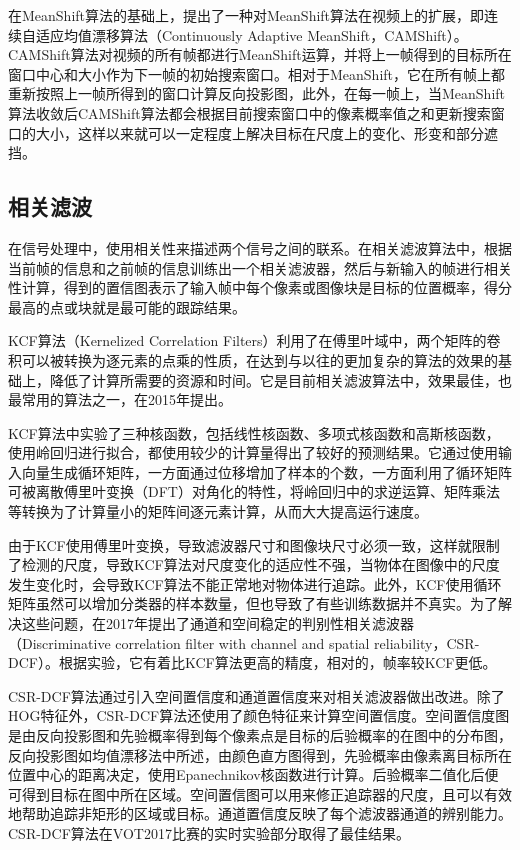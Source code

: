   在MeanShift算法的基础上，\citet{bradski1998computer}提出了一种对MeanShift算法在视频上的扩展，即连续自适应均值漂移算法（Continuously Adaptive MeanShift，CAMShift）。CAMShift算法对视频的所有帧都进行MeanShift运算，并将上一帧得到的目标所在窗口中心和大小作为下一帧的初始搜索窗口。相对于MeanShift，它在所有帧上都重新按照上一帧所得到的窗口计算反向投影图，此外，在每一帧上，当MeanShift算法收敛后CAMShift算法都会根据目前搜索窗口中的像素概率值之和更新搜索窗口的大小，这样以来就可以一定程度上解决目标在尺度上的变化、形变和部分遮挡。

\subsection{相关滤波}

  在信号处理中，使用相关性来描述两个信号之间的联系。在相关滤波算法中，根据当前帧的信息和之前帧的信息训练出一个相关滤波器，然后与新输入的帧进行相关性计算，得到的置信图表示了输入帧中每个像素或图像块是目标的位置概率，得分最高的点或块就是最可能的跟踪结果。

  KCF算法（Kernelized Correlation Filters）利用了在傅里叶域中，两个矩阵的卷积可以被转换为逐元素的点乘的性质，在达到与以往的更加复杂的算法的效果的基础上，降低了计算所需要的资源和时间。它是目前相关滤波算法中，效果最佳，也最常用的算法之一，\citet{henriques2015high}在2015年提出。

  KCF算法中实验了三种核函数，包括线性核函数、多项式核函数和高斯核函数，使用岭回归进行拟合，都使用较少的计算量得出了较好的预测结果。它通过使用输入向量生成循环矩阵，一方面通过位移增加了样本的个数，一方面利用了循环矩阵可被离散傅里叶变换（DFT）对角化的特性，将岭回归中的求逆运算、矩阵乘法等转换为了计算量小的矩阵间逐元素计算，从而大大提高运行速度。

  由于KCF使用傅里叶变换，导致滤波器尺寸和图像块尺寸必须一致，这样就限制了检测的尺度，导致KCF算法对尺度变化的适应性不强，当物体在图像中的尺度发生变化时，会导致KCF算法不能正常地对物体进行追踪。此外，KCF使用循环矩阵虽然可以增加分类器的样本数量，但也导致了有些训练数据并不真实。为了解决这些问题，\citet{lukezic2017discriminative}在2017年提出了通道和空间稳定的判别性相关滤波器（Discriminative correlation filter with channel and spatial reliability，CSR-DCF）。根据实验，它有着比KCF算法更高的精度，相对的，帧率较KCF更低。

  CSR-DCF算法通过引入空间置信度和通道置信度来对相关滤波器做出改进。除了HOG特征外，CSR-DCF算法还使用了颜色特征来计算空间置信度。空间置信度图是由反向投影图和先验概率得到每个像素点是目标的后验概率的在图中的分布图，反向投影图如均值漂移法中所述，由颜色直方图得到，先验概率由像素离目标所在位置中心的距离决定，使用Epanechnikov核函数进行计算。后验概率二值化后便可得到目标在图中所在区域。空间置信图可以用来修正追踪器的尺度，且可以有效地帮助追踪非矩形的区域或目标。通道置信度反映了每个滤波器通道的辨别能力。CSR-DCF算法在VOT2017比赛的实时实验部分取得了最佳结果\cite{kristan2017visual}。


